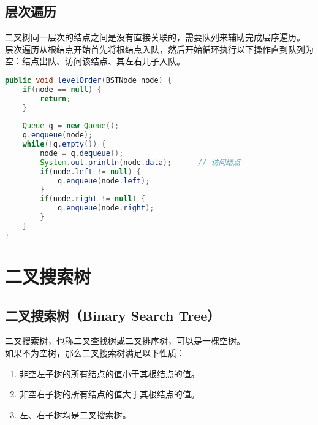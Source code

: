 \subsection{层次遍历}

二叉树同一层次的结点之间是没有直接关联的，需要队列来辅助完成层序遍历。 \\

层次遍历从根结点开始首先将根结点入队，然后开始循环执行以下操作直到队列为空：结点出队、访问该结点、其左右儿子入队。 \\


\begin{lstlisting}[language=Java]
public void levelOrder(BSTNode node) {
    if(node == null) {
        return;
    }
    
    Queue q = new Queue();
    q.enqueue(node);
    while(!q.empty()) {
        node = q.dequeue();
        System.out.println(node.data);		// 访问结点
        if(node.left != null) {
            q.enqueue(node.left);
        }
        if(node.right != null) {
            q.enqueue(node.right);
        }
    }
}
\end{lstlisting}

\newpage

\section{二叉搜索树}

\subsection{二叉搜索树（Binary Search Tree）}

二叉搜索树，也称二叉查找树或二叉排序树，可以是一棵空树。 \\

如果不为空树，那么二叉搜索树满足以下性质：

\begin{enumerate}
    \item 非空左子树的所有结点的值小于其根结点的值。
    \item 非空右子树的所有结点的值大于其根结点的值。
    \item 左、右子树均是二叉搜索树。
\end{enumerate}

